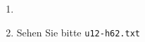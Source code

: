 \begin{enumerate}[label={Aufgabe H\arabic*},start=60]
    \item 
    \item Sehen Sie bitte \texttt{u12-h62.txt}
\end{enumerate}